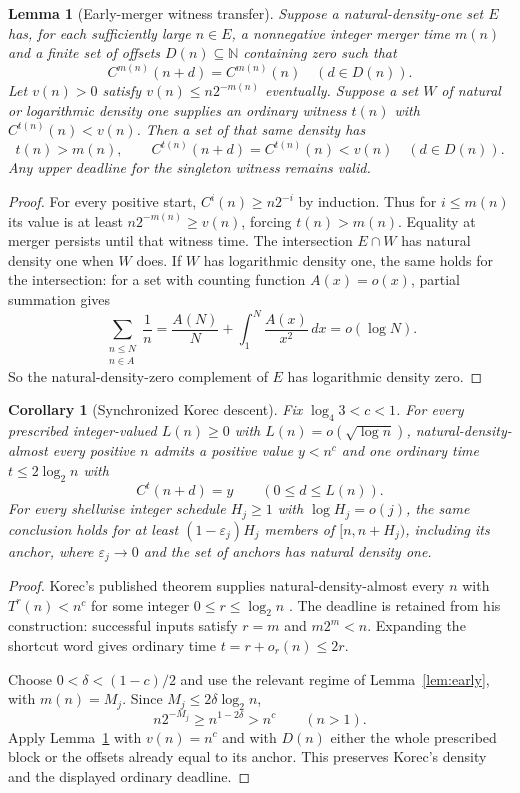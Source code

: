 \documentclass[11pt]{amsart}
\newtheorem{lemma}[theorem]{Lemma}
\newtheorem{corollary}[theorem]{Corollary}
\theoremstyle{definition}
\theoremstyle{remark}
\newcommand{\N}{\mathbb N}
\begin{document}
\begin{lemma}[Early-merger witness transfer]\label{descent:transfer}
Suppose a natural-density-one set $E$ has, for each sufficiently large
$n\in E$, a nonnegative integer merger time $m(n)$ and a finite set of offsets
$D(n)\subseteq\N$ containing zero such that
\[
 C^{m(n)}(n+d)=C^{m(n)}(n)\quad(d\in D(n)).
\]
Let $v(n)>0$ satisfy $v(n)\le n2^{-m(n)}$ eventually. Suppose a set $W$
of natural or logarithmic density one supplies an ordinary witness
$t(n)$ with $C^{t(n)}(n)<v(n)$. Then a set of that same density has
\[
 t(n)>m(n),\qquad C^{t(n)}(n+d)=C^{t(n)}(n)<v(n)\quad(d\in D(n)).
\]
Any upper deadline for the singleton witness remains valid.
\end{lemma}
\begin{proof}
For every positive start, $C^i(n)\ge n2^{-i}$ by induction. Thus for
$i\le m(n)$ its value is at least $n2^{-m(n)}\ge v(n)$, forcing
$t(n)>m(n)$. Equality at merger persists until that witness time.
The intersection $E\cap W$ has natural density one when $W$ does.
If $W$ has logarithmic density one, the same holds for the intersection:
for a set with counting function $A(x)=o(x)$, partial summation gives
\[
 \sum_{\substack{n\le N\\n\in A}}\frac1n
 =\frac{A(N)}N+\int_1^N\frac{A(x)}{x^2}\,dx=o(\log N).
\]
So the natural-density-zero complement of $E$ has logarithmic density zero.
\end{proof}

\begin{corollary}[Synchronized Korec descent]\label{thm:power-window}\label{cor:majority-power}
Fix $\log_4 3<c<1$. For every prescribed integer-valued $L(n)\ge0$
with $L(n)=o(\sqrt{\log n})$,
natural-density-almost every positive $n$ admits a positive value $y<n^c$
and one ordinary time $t\le2\log_2n$ with
\[
 C^t(n+d)=y\qquad(0\le d\le L(n)).
\]
For every shellwise integer schedule $H_j\ge1$ with $\log H_j=o(j)$, the same
conclusion holds for at least $(1-\varepsilon_j)H_j$ members of
$[n,n+H_j)$, including its anchor, where $\varepsilon_j\to0$ and the
set of anchors has natural density one.
\end{corollary}
\begin{proof}
Korec's published theorem supplies natural-density-almost every $n$ with
$T^r(n)<n^c$ for some integer $0\le r\le\log_2n$
\cite[Theorem~1 and pp.~86--88]{Korec1994}. The deadline is retained from
his construction: successful inputs satisfy $r=m$ and $m2^m<n$.
Expanding the shortcut word gives ordinary time $t=r+o_r(n)\le2r$.

Choose $0<\delta<(1-c)/2$ and use the relevant regime of
Lemma~\ref{lem:early}, with $m(n)=M_j$. Since $M_j\le2\delta\log_2n$,
\[
 n2^{-M_j}\ge n^{1-2\delta}>n^c\qquad(n>1).
\]
Apply Lemma~\ref{descent:transfer} with $v(n)=n^c$ and with $D(n)$ either
the whole prescribed block or the offsets already equal to its anchor.
This preserves Korec's density and the displayed ordinary deadline.
\end{proof}
\end{document}
